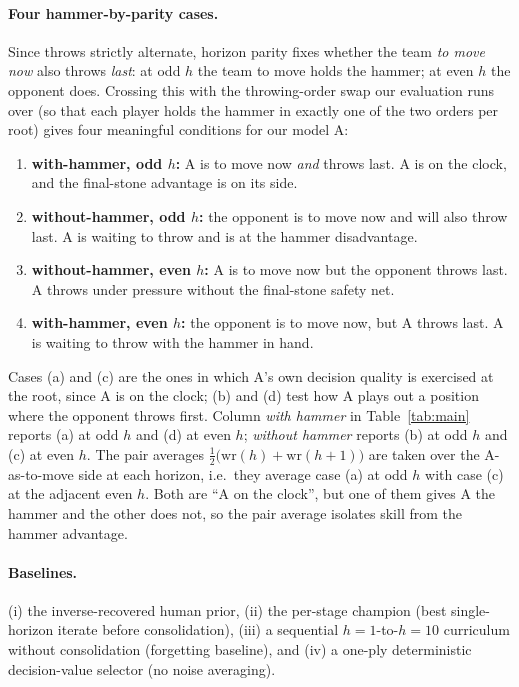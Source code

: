 \documentclass[11pt]{article}
\begin{document}
\paragraph{Four hammer-by-parity cases.}
Since throws strictly alternate, horizon parity fixes whether the team
\emph{to move now} also throws \emph{last}: at odd $h$ the team to move
holds the hammer; at even $h$ the opponent does. Crossing this with the
throwing-order swap our evaluation runs over (so that each player holds the
hammer in exactly one of the two orders per root) gives four meaningful
conditions for our model A:
\begin{enumerate}\setlength\itemsep{0pt}
\item[(a)] \textbf{with-hammer, odd $h$:} A is to move now \emph{and} throws
last. A is on the clock, and the final-stone advantage is on its side.
\item[(b)] \textbf{without-hammer, odd $h$:} the opponent is to move now and
will also throw last. A is waiting to throw and is at the hammer
disadvantage.
\item[(c)] \textbf{without-hammer, even $h$:} A is to move now but the
opponent throws last. A throws under pressure without the final-stone
safety net.
\item[(d)] \textbf{with-hammer, even $h$:} the opponent is to move now,
but A throws last. A is waiting to throw with the hammer in hand.
\end{enumerate}
Cases (a) and (c) are the ones in which A's own decision quality is
exercised at the root, since A is on the clock; (b) and (d) test how A
plays out a position where the opponent throws first. Column
\emph{with hammer} in Table~\ref{tab:main} reports (a) at odd $h$ and (d)
at even $h$; \emph{without hammer} reports (b) at odd $h$ and (c) at
even $h$. The pair averages
$\tfrac{1}{2}\big(\text{wr}(h)+\text{wr}(h{+}1)\big)$ are taken over the
A-as-to-move side at each horizon, i.e.\ they average case (a) at odd $h$
with case (c) at the adjacent even $h$. Both are ``A on the clock'', but
one of them gives A the hammer and the other does not, so the pair average
isolates skill from the hammer advantage.

\paragraph{Baselines.}
(i) the inverse-recovered human prior, (ii) the per-stage champion (best
single-horizon iterate before consolidation), (iii) a sequential
$h=1$-to-$h=10$ curriculum without consolidation (forgetting baseline),
and (iv) a one-ply deterministic decision-value selector (no noise
averaging).
\end{document}
